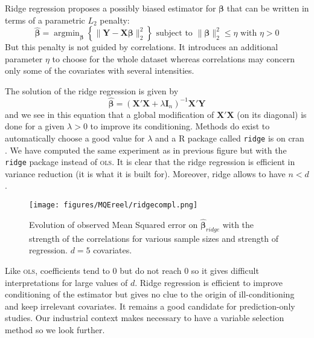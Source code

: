 \documentclass[12pt,a4paper]{report}
\begin{document}
Ridge regression \cite{hoerl1970ridge,marquardt1975ridge} proposes a possibly biased estimator for $\boldsymbol{\beta}$ that can be written in terms of a parametric $L_2$ penalty:
	\begin{equation}
		 \boldsymbol{\hat{\beta}}=\operatorname{argmin}_{\boldsymbol{\beta}} \left\lbrace \parallel \boldsymbol{Y}-\boldsymbol{X\beta}\parallel_2^2 \right\rbrace \textrm{ subject to } \parallel \boldsymbol{\beta} \parallel_2^2\leq \eta \textrm{ with } \eta>0
	\end{equation}
	But this penalty is not guided by correlations. It introduces an additional parameter $\eta$ to choose for the whole dataset  whereas correlations may concern only some of the covariates with several intensities.
	
	The solution of the ridge regression is given by
	\begin{equation}
		 \hat{\boldsymbol{\beta}}=\left(\boldsymbol{X}'\boldsymbol{X} +\lambda\boldsymbol{I}_n\right) ^{-1}\boldsymbol{X}'\boldsymbol{Y}\label{betaridge}
	\end{equation}
	and we see in this equation that a global modification of $\boldsymbol{X}'\boldsymbol{X}$ (on its diagonal) is done for a given $\lambda>0$ to improve its conditioning. Methods do exist to automatically choose a good value for $\lambda$ \cite{cule2013ridge,er2013systematic} and a R package called {\tt ridge} is on {\sc cran} \cite{packageridge}. 
	We have computed the same experiment as in previous figure but with the {\tt ridge} package instead of \textsc{ols}. It is clear that the ridge regression is efficient in variance reduction (it is what it is built for). Moreover, ridge allows to have $n<d$.\\
	
	 \begin{figure}
	 \centering
	  \texttt{[image: figures/MQEreel/ridgecompl.png]}
	  \caption{Evolution of observed Mean Squared error on $\hat{\boldsymbol{\beta}}_{ridge}$ with the strength of the correlations for various sample sizes and strength of regression. $d=5$ covariates. } \label{MQEridgecompl}
	\end{figure}
	
	
	Like \textsc{ols}, coefficients tend to 0 but do not reach 0 so it gives difficult interpretations for large values of $d$. Ridge regression is efficient to improve conditioning of the estimator but gives no clue to the origin of ill-conditioning and keep irrelevant covariates. It remains a good candidate for prediction-only studies. Our industrial context makes necessary to have a variable selection method so we look further.
	
\end{document}
